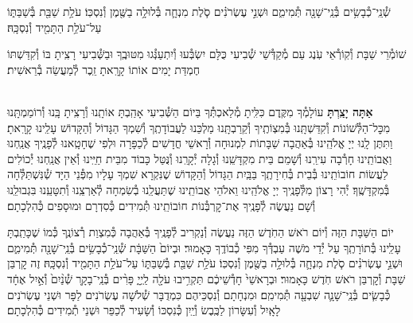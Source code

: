 \documentclass[twoside, openany, parskip=half, 11pt]{book}
\begin{document}
שְׁ֯נֵֽי־כְ֯בָשִׂ֥ים בְּ֯נֵֽי־שָׁנָ֖ה תְּ֯מִימִ֑ם וּשְׁנֵ֣י עֶשְׂרֹנִ֗ים סֹ֧לֶת מִנְחָ֛ה בְּ֯לוּלָ֥ה בַשֶּׁ֖מֶן וְ֯נִסְכּֽוֹ׃ עֹלַ֥ת שַׁבַּ֖ת בְּ֯שַׁבַּתּ֑וֹ עַל־עֹלַ֥ת הַתָּמִ֖יד וְ֯נִסְכָּֽהּ׃

שׁוֹמְ֯רֵי שַׁבָּת וְ֯קֽוֹרְ֯אֵי עֹֽנֶג עַם מְ֯קַדְּ֯שֵׁי שְׁ֯בִיעִי כֻּלָּם יִשְׂבְּ֯עוּ וְ֯יִתְעַנְּ֯גוּ מִטּוּבֶֽךָ וּבַשְּׁ֯בִיעִי רָצִֽיתָ בּוֹ וְ֯קִדַּשְׁתּוֹ חֶמְדַּת יָמִים אוֹתוֹ קָרָֽאתָ זֵֽכֶר לְ֯מַעֲשֵׂה בְ֯רֵאשִׁית׃

\shabboskiddushhayom{} 

\begin{sometimes}

\label{shabbosroshchodesh}
\\
\textbf{אַתָּה יָצַֽרְתָּ}
עוֹלָמְ֯ךָ מִקֶּֽדֶם כִּלִּֽיתָ מְ֯לַאכְתְּ֯ךָ בַּיוֹם הַשְּׁ֯בִיעִי אָהַֽבְתָּ אוֹתָֽנוּ וְ֯רָצִֽיתָ בָּֽנוּ וְ֯רוֹמַמְתָּֽנוּ מִכׇּל־הַלְּ֯שׁוֹנוֹת וְ֯קִדַּשְׁתָּֽנוּ בְּ֯מִצְוֹתֶֽיךָ וְ֯קֵרַבְתָּֽנוּ מַלְכֵּנוּ לַעֲבוֹדָתֶֽךָ וְ֯שִׁמְךָ הַגָּדוֹל וְ֯הַקָּדוֹשׁ עָלֵֽינוּ קָרָֽאתָ׃ וַתִּתֶּן לָֽנוּ יְיָ אֱלֹהֵֽינוּ בְּ֯אַהֲבָה שַׁבָּתוֹת לִמְנוּחָה וְ֯רָאשֵׁי חֳדָשִׁים לְ֯כַפָּרָה וּלְפִי שֶׁחָטָֽאנוּ לְ֯פָנֶֽיךָ אֲנַֽחְנוּ וַאֲבוֹתֵֽינוּ חָרְ֯בָה עִירֵֽנוּ וְ֯שָׁמֵם בֵּית מִקְדָּשֵֽׁנוּ וְ֯גָלָה יְ֯קָרֵֽנוּ וְ֯נֻּטַּל כָּבוֹד מִבֵּית חַיֵּֽינוּ וְ֯אֵין אֲנַֽחְנוּ יְ֯כוֹלִים לַעֲשׂוֹת חוֹבוֹתֵֽינוּ בְּ֯בֵית בְּ֯חִירָתֶֽךָ בַּבַּֽיִת הַגָּדוֹל וְ֯הַקָּדוֹשׁ שֶׁנִּקְרָא שִׁמְךָ עָלָיו מִפְּ֯נֵי הַיָּד שְׁ֯נִּשְׁתַּלְּ֯חָה בְּ֯מִקְדָּשֶֽׁךָ׃ יְ֯הִי רָצוֹן מִלְּ֯פָנֶֽיךָ יְיָ אֱלֹהֵֽינוּ וֵאלֹהֵי אֲבוֹתֵֽינוּ שֶׁתַּעֲלֵֽנוּ בְ֯שִׂמְחָה לְ֯אַרְצֵֽנוּ וְ֯תִטָּעֵֽנוּ בִּגְבוּלֵֽנוּ וְ֯שָׁם נַעֲשֶׂה לְ֯פָנֶֽיךָ אֶת־קׇרְבְּ֯נוֹת חוֹבוֹתֵֽינוּ תְּ֯מִידִים כְּ֯סִדְרָם וּמוּסָפִים כְּ֯הִלְכָתָם׃

יוֹם הַשַּׁבָּת הַזֶּה וְ֯יוֹם רֹאשׁ הַחֹֽדֶשׁ הַזֶּה נַעֲשֶׂה וְ֯נַקְרִיב לְ֯פָנֶֽיךָ בְּ֯אַהֲבָה כְּ֯מִצְוַת רְ֯צוֹנֶֽךָ כְּ֯מוֹ שֶׁכָּתַֽבְתָּ עָלֵֽינוּ בְּ֯תוֹרָתֶֽךָ עַל יְ֯דֵי מֹשֶׁה עַבְדְּ֯ךָ מִפִּי כְ֯בוֹדֶֽךָ כָּאָמוּר׃ וּבְיוֹם֙ הַשַּׁבָּ֔ת שְׁ֯נֵֽי־כְ֯בָשִׂ֥ים בְּ֯נֵֽי־שָׁנָ֖ה תְּ֯מִימִ֑ם וּשְׁנֵ֣י עֶשְׂרֹנִ֗ים סֹ֧לֶת מִנְחָ֛ה בְּ֯לוּלָ֥ה בַשֶּׁ֖מֶן וְ֯נִסְכּֽוֹ׃ עֹלַ֥ת שַׁבַּ֖ת בְּ֯שַׁבַּתּ֑וֹ עַל־עֹלַ֥ת הַתָּמִ֖יד וְ֯נִסְכָּֽהּ׃ זֶה קׇרְבַּן שַׁבָּת וְ֯קׇרְבַּן רֹאשׁ חֹֽדֶשׁ כָּאָמוּר׃ וּבְרָאשֵׁי֙ חָדְ֯שֵׁיכֶ֔ם תַּקְרִ֥יבוּ עֹלָ֖ה לַֽיְיָ֑ פָּרִ֨ים בְּ֯נֵֽי־בָקָ֤ר שְׁ֯נַ֨יִם֙ וְ֯אַ֣יִל אֶחָ֔ד כְּ֯בָשִׂ֧ים בְּ֯נֵֽי־שָׁנָ֛ה שִׁבְעָ֖ה תְּ֯מִימִֽם׃ וּמִנְחָתָם וְ֯נִסְכֵּיהֶם כִּמְדֻבָּר שְׁ֯לֹשָׁה עֶשְׂרֹנִים לַפָּר וּשְׁנֵי עֶשְׂרֹנִים לָאָֽיִל וְ֯עִשָּׂרוֹן לַכֶּֽבֶשׂ וְ֯יַֽיִן כְּ֯נִסְכּוֹ וְ֯שָׂעִיר לְ֯כַפֵּר וּשְׁנֵי תְ֯מִידִים כְּ֯הִלְכָתָם׃


\end{sometimes}
\end{document}
